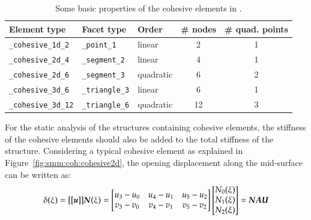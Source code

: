 \begin{table}[!htb]
\begin{center}
\begin{tabular}{l|llcc}
\toprule
Element type & Facet type & Order & \# nodes & \# quad. points  \\
\midrule
\texttt{\_cohesive\_1d\_2} & \texttt{\_point\_1} & linear & 2 & 1  \\
\hline
\texttt{\_cohesive\_2d\_4} & \texttt{\_segment\_2} & linear & 4 & 1  \\
\texttt{\_cohesive\_2d\_6} & \texttt{\_segment\_3} & quadratic & 6 & 2  \\
\hline
\texttt{\_cohesive\_3d\_6} & \texttt{\_triangle\_3} & linear & 6 & 1  \\
\texttt{\_cohesive\_3d\_12} & \texttt{\_triangle\_6} & quadratic & 12 & 3  \\
\bottomrule
\end{tabular}
\end{center}
\caption{Some basic properties of the cohesive elements in \akantu.}
\label{tab:cohesive_elements}
\end{table}

For the static analysis of the structures containing cohesive
elements, the stiffness of the cohesive elements should also be added
to the total stiffness of the structure. Considering a typical
cohesive element as explained in Figure~\ref{fig:smm:coh:cohesive2d},
the opening displacement along the mid-surface can be written as:
\begin{equation}
  \label{eq:opening}
  \delta(\xi) = [[\boldsymbol{u}]] \boldsymbol{N}(\xi) =
  \begin{bmatrix}
    u_3-u_0 & u_4-u_1 & u_5-u_2\\
    v_3-v_0 & v_4-v_1 & v_5-v_2
  \end{bmatrix}
  \begin{bmatrix}
    N_0(\xi) \\ N_1(\xi) \\ N_2(\xi)
  \end{bmatrix} =
  \boldsymbol{N A U}
\end{equation}

